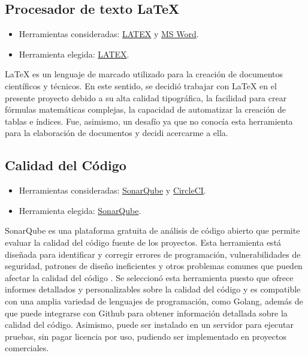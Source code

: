 \subsection{Procesador de texto \LaTeX}
\begin{itemize}
\tightlist
\item
  Herramientas consideradas:
  \href{https://www.latex-project.org/}{LATEX} y 
  \href{https://www.microsoft.com/en-ww/microsoft-365/word)}{MS Word}.
\item
  Herramienta elegida: \href{https://www.latex-project.org/}{LATEX}.
\end{itemize}
\LaTeX{} es un lenguaje de marcado utilizado para la creación de documentos científicos y técnicos. En este sentido, se decidió trabajar con \LaTeX{} en el presente proyecto debido a su alta calidad tipográfica, la facilidad para crear fórmulas matemáticas complejas, la capacidad de automatizar la creación de tablas e índices\cite{art:latex}. Fue, asimismo, un desafío ya que no conocía esta herramienta para la elaboración de documentos y decidi acercarme a ella.


\subsection{Calidad del Código}
\begin{itemize}
\tightlist
\item
  Herramientas consideradas:
  \href{https://www.sonarsource.com/products/sonarqube/}{SonarQube} y 
  \href{https://circleci.com/)}{CircleCI}.
\item
  Herramienta elegida: \href{https://www.sonarsource.com/products/sonarqube/}{SonarQube}.
\end{itemize}
SonarQube es una plataforma gratuita de análisis de código abierto que permite evaluar la calidad del código fuente de los proyectos. Esta herramienta está diseñada para identificar y corregir errores de programación, vulnerabilidades de seguridad, patrones de diseño ineficientes y otros problemas comunes que pueden afectar la calidad del código \cite{art:sonarqube_ortega}. Se seleccionó esta herramienta puesto que ofrece informes detallados y personalizables sobre la calidad del código y es compatible con una amplia variedad de lenguajes de programación, como Golang, además de que puede integrarse con Github para obtener información detallada sobre la calidad del código. Asimismo, puede ser instalado en un servidor para ejecutar pruebas, sin pagar licencia por uso, pudiendo ser implementado en proyectos comerciales.


